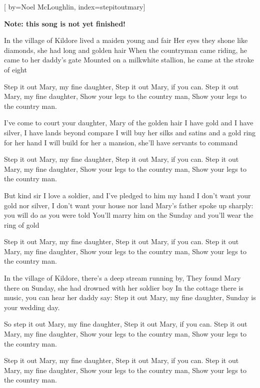 

[%
    by={Noel McLoughlin},
    index={stepitoutmary}]


    \label{stepitoutmary}

    \textbf{Note: this song is not yet finished!}

    \beginverse
        In the village of Kildore lived a maiden young and fair
        Her eyes they shone like diamonds, she had long and golden hair
        When the countryman came riding, he came to her daddy's gate
        Mounted on a milkwhite stallion, he came at the stroke of eight
    \endverse

    \beginchorus
        Step it out Mary, my fine daughter,
        Step it out Mary, if you can.
        Step it out Mary, my fine daughter,
        Show your legs to the country man,
        Show your legs to the country man.
    \endchorus

    \beginverse
        I've come to court your daughter, Mary of the golden hair
        I have gold and I have silver, I have lands beyond compare
        I will buy her silks and satins and a gold ring for her hand
        I will build for her a mansion, she'll have servants to command
    \endverse

    \beginchorus
        Step it out Mary, my fine daughter,
        Step it out Mary, if you can.
        Step it out Mary, my fine daughter,
        Show your legs to the country man,
        Show your legs to the country man.
    \endchorus

    \beginverse
        But kind sir I love a soldier, and I've pledged to him my hand
        I don't want your gold nor silver, I don't want your house nor land
        Mary's father spoke up sharply: you will do as you were told
        You'll marry him on the Sunday and you'll wear the ring of gold
    \endverse

    \beginchorus
        Step it out Mary, my fine daughter,
        Step it out Mary, if you can.
        Step it out Mary, my fine daughter,
        Show your legs to the country man,
        Show your legs to the country man.
    \endchorus

    \beginverse
        In the village of Kildore, there's a deep stream running by,
        They found Mary there on Sunday, she had drowned with her soldier boy
        In the cottage there is music, you can hear her daddy say:
        Step it out Mary, my fine daughter, Sunday is your wedding day.
    \endverse

    \beginchorus
        So step it out Mary, my fine daughter,
        Step it out Mary, if you can.
        Step it out Mary, my fine daughter,
        Show your legs to the country man,
        Show your legs to the country man.
    \endchorus

    \beginchorus
        Step it out Mary, my fine daughter,
        Step it out Mary, if you can.
        Step it out Mary, my fine daughter,
        Show your legs to the country man,
        Show your legs to the country man.
    \endchorus
\endsong
